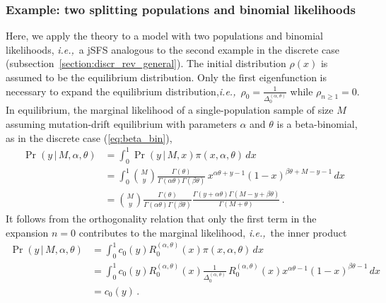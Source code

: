 \documentclass[preprint]{elsarticle}
\newcommand\given{{\,|\,}}
\newcommand\ie{{\it i.e.,}}
\newcommand\y{\ensuremath{y}}
\begin{document}

\subsubsection{Example: two splitting populations and binomial likelihoods}

Here, we apply the theory to a model with two populations and binomial likelihoods, \ie\ a jSFS analogous to the second example in the discrete case (subsection~\ref{section:discr_rev_general}). The initial distribution $\rho(x)$ is assumed to be the equilibrium distribution. Only the first eigenfunction is necessary to expand the equilibrium distribution,\ie\ $\rho_0=\frac{1}{\Delta_0^{(\alpha,\theta)}}$ while $\rho_{n\geq1}=0$. In equilibrium, the marginal likelihood of a single-population sample of size $M$ assuming mutation-drift equilibrium with parameters $\alpha$ and $\theta$ is a beta-binomial, as in the discrete case (\ref{eq:beta_bin}),
\begin{equation}
\begin{split}
    \Pr(\y\given M,\alpha,\theta)
    &=\int_0^1 \Pr(\y\given M,x) \pi(x,\alpha,\theta)\,dx\\
    &=\int_0^1 \binom{M}{\y}\frac{\Gamma(\theta)}{\Gamma(\alpha\theta)\Gamma(\beta\theta)}\,x^{\alpha\theta+\y-1}(1-x)^{\beta\theta+M-\y-1}\,dx\\
    &=\binom{M}{\y}\frac{\Gamma(\theta)}{\Gamma(\alpha\theta)\Gamma(\beta\theta)}
    \frac{\Gamma(\y+\alpha\theta)\Gamma(M-\y+\beta\theta)}{\Gamma(M+\theta)}\,.
\end{split}
\end{equation}
It follows from the orthogonality relation that only the first term in the expansion $n=0$ contributes to the marginal likelihood, \ie\ the inner product
\begin{equation}
\begin{split}
    \Pr(\y\given M,\alpha,\theta)&=\int_0^1 c_0(\y) R_0^{(\alpha,\theta)}(x) \pi(x,\alpha,\theta)\,dx\\
    &=\int_0^1 c_0(\y) R_0^{(\alpha,\theta)}(x) \frac{1}{\Delta_0^{(\alpha,\theta)}}\,R_0^{(\alpha,\theta)}(x) x^{\alpha\theta-1}(1-x)^{\beta\theta-1}\,dx\\
    &=c_0(\y)\,.
\end{split}
\end{equation}
\end{document}
